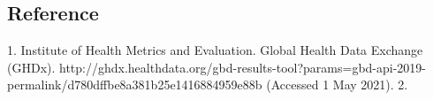 \documentclass[a0,portrait]{a0poster}
\begin{document}
\begin{minipage}[c]{\linewidth}
\begin{framed}
\begin{multicols}{2}
\section*{Reference}
\tiny \textnormal{1. Institute of Health Metrics and Evaluation. Global Health Data Exchange (GHDx).  http://ghdx.healthdata.org/gbd-results-tool?params=gbd-api-2019-permalink/d780dffbe8a381b25e1416884959e88b (Accessed 1 May 2021).}
\tiny \textnormal{2. }
\end{multicols}
\vspace{0.5cm}
\end{framed}
\end{minipage}
\end{document}
